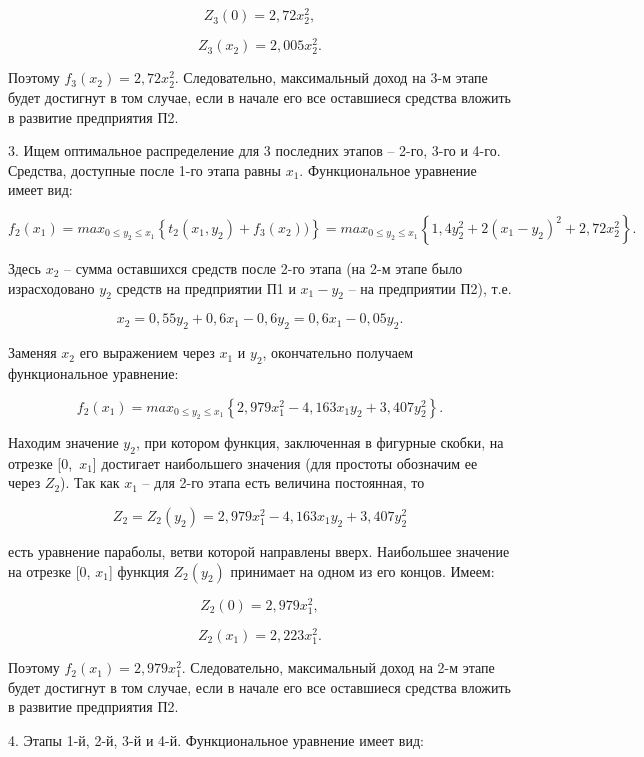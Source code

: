 \documentclass[12pt]{article}
\begin{document}
$$ Z_3 ( 0 ) = 2{,}72 x_{2}^{2}, $$

$$ Z_3 ( x_{2} ) = 2{,}005 x_{2}^{2}. $$

Поэтому $ f_3 ( x_{2} ) = 2{,}72 x_{2}^{2} $. Следовательно, максимальный доход на 3-м этапе будет достигнут в том случае, если в начале его все оставшиеся средства вложить в развитие предприятия П2.

3. Ищем оптимальное распределение для 3 последних этапов – 2-го,  3-го и 4-го. Средства, доступные после 1-го этапа равны $ x_{1} $. Функциональное уравнение имеет вид:

$$ f_2 ( x_{1} ) = max_{ 0 \le y_2 \le x_{1} }{\left\{ t_2 ( x_{1}, y_2 ) + f_3 ( x_2 ) )\right\}}= max_{ 0 \le y_2 \le x_{1} }{\left\{ 1{,}4 y_{2}^{2} + 2 \left(x_{1} - y_{2}\right)^{2} + 2{,}72 x_{2}^{2} \right\}}.$$

Здесь $ x_2 $ – сумма оставшихся средств после 2-го этапа (на 2-м этапе было израсходовано $ y_{2} $ средств на предприятии П1 и $ x_{1} - y_{2} $ – на предприятии П2), т.е.

$$ x_2 = 0{,}55 y_{2} + 0{,}6 x_{1} - 0{,}6 y_{2} = 0{,}6 x_{1} - 0{,}05 y_{2} .$$

Заменяя $ x_2 $ его выражением через $ x_{1} $ и $ y_{2} $, окончательно получаем функциональное уравнение:

$$ f_2 ( x_{1} ) = max_{ 0 \le y_2 \le x_{1} }{\left\{ 2{,}979 x_{1}^{2} - 4{,}163 x_{1} y_{2} + 3{,}407 y_{2}^{2} \right\}}.$$

Находим значение $ y_{2} $, при котором функция, заключенная в фигурные скобки, на отрезке [0,~$ x_{1} $] достигает наибольшего значения (для простоты обозначим ее через $ Z_2 $). Так как $ x_{1} $ – для 2-го этапа есть величина постоянная, то

$$ Z_2 = Z_2 ( y_2 ) =  2{,}979 x_{1}^{2} - 4{,}163 x_{1} y_{2} + 3{,}407 y_{2}^{2} $$

есть уравнение параболы, ветви которой направлены вверх. Наибольшее значение на отрезке [0, $ x_{1} $] функция $ Z_2 ( y_2 ) $ принимает на одном из его концов. Имеем:

$$ Z_2 ( 0 ) = 2{,}979 x_{1}^{2}, $$

$$ Z_2 ( x_{1} ) = 2{,}223 x_{1}^{2}. $$

Поэтому $ f_2 ( x_{1} ) = 2{,}979 x_{1}^{2} $. Следовательно, максимальный доход на 2-м этапе будет достигнут в том случае, если в начале его все оставшиеся средства вложить в развитие предприятия П2.

4. Этапы 1-й, 2-й, 3-й и 4-й. Функциональное уравнение имеет вид:
\end{document}
